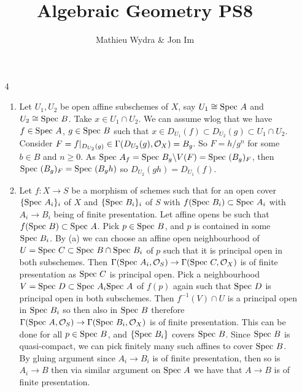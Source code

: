 \documentclass[10pt,a4paper]{article}
\title{Algebraic Geometry PS8}
\author{Mathieu Wydra \& Jon Im}
\begin{document}
\maketitle
\begin{enumerate}
\item[4] \begin{enumerate}
\item Let $U_1,U_2$ be open affine subschemes of $X$, say $U_1 \cong \text{Spec } A$ and $U_2 \cong \text{Spec } B$. Take $x\in U_1\cap U_2$. We can assume wlog that we have $f\in  \text{Spec } A$, $g\in \text{Spec } B$  such that $ x\in D_{U_1}(f)\subset D_{U_2}(g) \subset U_1\cap U_2$. Consider $F = f\vert_{D_{U_2}(g)}\in \Gamma(D_{U_2}(g),\mathcal{O}_X) = B_g$. So $F = h/g^n$ for some $b\in B$ and $n\geq 0$. 
As $\text{Spec } A_f = \text{Spec } B_g\backslash V(F) = \text{Spec } (B_g)_F$, then $\text{Spec } (B_g)_F = \text{Spec } (B_gh)$ so $D_{U_2}(gh) = D_{U_1}(f)$.

\item Let $f:X\to S$ be a morphism of schemes such that for an open cover $\{\text{Spec } A_i\}_i$ of $X$ and $\{\text{Spec } B_i\}_i$ of $S$ with $f(\text{Spec } B_i)\subset \text{Spec } A_i $ with $A_i\to B_i$ being of finite presentation. Let affine opens be such that $f(\text{Spec } B) \subset \text{Spec } A$. Pick $p\in \text{Spec } B$, and $p$ is contained in some $\text{Spec } B_i$. By (a) we can choose an affine open neighbourhood of $U = \text{Spec } C\subset \text{Spec } B \cap \text{Spec } B_i$ of $p$ such that it is principal open in both subschemes. Then $\Gamma(\text{Spec } A_i,\mathcal{O}_S)\to \Gamma(\text{Spec } C,\mathcal{O}_X)$ is of finite presentation as $\text{Spec } C$ is principal open. Pick a neighbourhood $V = \text{Spec } D \subset \text{Spec } A_i \text{Spec } A$ of $f(p)$ again such that $\text{Spec } D$ is principal open in both subschemes. Then $f^{-1}(V)\cap U$ is a principal open in $\text{Spec } B_i$ so then also in $\text{Spec } B$ therefore $\Gamma(\text{Spec } A,\mathcal{O}_S)\to \Gamma(\text{Spec } B_i,\mathcal{O}_X)$ is of finite presentation. This can be done for all $p\in\text{Spec } B$, and $\{\text{Spec } B_i\}$ covers $\text{Spec } B$. Since $\text{Spec } B$ is quasi-compact, we can pick finitely many such affines to cover $\text{Spec } B$. By gluing argument since $A_i\to B_i$ is of finite presentation, then so is $A_i\to B$ then via similar argument on $\text{Spec } A$ we have that $A\to B$ is of finite presentation.
\end{enumerate}
\end{enumerate}
\end{document}
